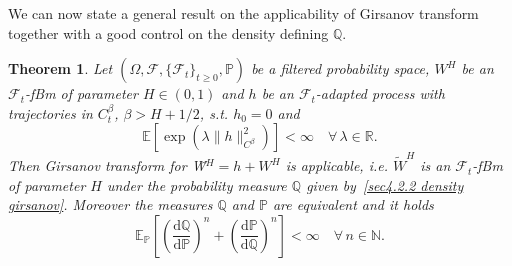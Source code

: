 \documentclass[10pt]{article}
\newcommand{\mathd}{\mathrm{d}}
\newtheorem{theorem}{Theorem}
\begin{document}
We can now state a general result on the applicability of Girsanov transform
together with a good control on the density defining $\mathbb{Q}$.

\begin{theorem}
  \label{sec4.2.2 theorem girsanov transform}Let $(\Omega, \mathcal{F}, \{
  \mathcal{F}_t \}_{t \geqslant 0}, \mathbb{P})$ be a filtered probability
  space, $W^H$ be an $\mathcal{F}_t$\mbox{-}fBm of parameter $H \in (0, 1)$
  and $h$ be an $\mathcal{F}_t$\mbox{-}adapted process with trajectories in
  $C^{\beta}_t$, $\beta > H + 1 / 2$, s.t. $h_0 = 0$ and
  \begin{equation}
    \mathbb{E} [\exp (\lambda \| h \|_{C^{\beta}}^2)] < \infty \quad \forall
    \, \lambda \in \mathbb{R}. \label{sec4.2.2 hypothesis application
    girsanov}
  \end{equation}
  Then Girsanov transform for \~{W}$^H = h + W^H$ is applicable, i.e.
  $\tilde{W}^H$ is an $\mathcal{F}_t$\mbox{-}fBm of parameter $H$ under the
  probability measure $\mathbb{Q}$ given by~{\eqref{sec4.2.2 density
  girsanov}}. Moreover the measures $\mathbb{Q}$ and $\mathbb{P}$ are
  equivalent and it holds
  \[ \mathbb{E}_{\mathbb{P}} \left[ \left( \frac{\mathd \mathbb{Q}}{\mathd
     \mathbb{P}} \right)^n + \left( \frac{\mathd \mathbb{P}}{\mathd
     \mathbb{Q}} \right)^n \right] < \infty \quad \forall \, n \in \mathbb{N}.
  \]
\end{theorem}
\end{document}
